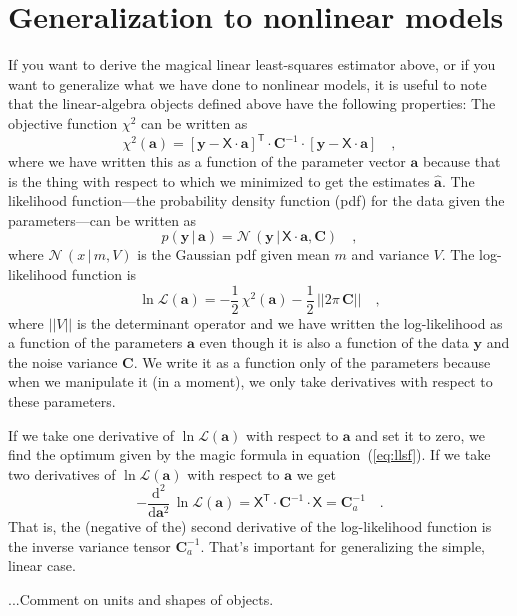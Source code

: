 \documentclass[10pt]{article}
\newcommand{\equationname}{equation}
\newcommand{\given}{\,|\,}
\newcommand{\dd}{\mathrm{d}}
\newcommand{\T}{^{\!\mathsf{T}\!}}
\newcommand{\inv}{^{-1}}
\renewcommand{\vector}[1]{\boldsymbol{#1}}
\newcommand{\tensor}[1]{\mathbf{#1}}
\renewcommand{\matrix}[1]{\mathsf{#1}}
\newcommand{\normal}{\mathcal{N}\!\,}
\newcommand{\like}{\mathscr{L}}
\newcommand{\va}{\vector{a}}
\newcommand{\vy}{\vector{y}}
\newcommand{\tC}{\tensor{C}}
\newcommand{\mX}{\matrix{X}}
\begin{document}
\section{Generalization to nonlinear models}

If you want to derive the magical linear least-squares estimator above,
or if you want to generalize what we have done to nonlinear models,
it is useful to note that the linear-algebra objects defined
above have the following properties:
The objective function $\chi^2$ can be written as
\begin{equation}
  \chi^2(\va) = [\vy - \mX\cdot\va]\T\cdot\tC\inv\cdot[\vy - \mX\cdot\va]
  \quad,
\end{equation}
where we have written this as a function of the parameter vector $\va$ because
that is the thing with respect to which we minimized to get the estimates
$\hat{\va}$.
The likelihood function---the probability density function (pdf) for
the data given the parameters---can be written as
\begin{equation}
  p(\vy\given\va) = \normal(\vy\given\mX\cdot\va,\tC)
  \quad,
\end{equation}
where $\normal(x\given m,V)$ is the Gaussian pdf given mean $m$ and variance $V$.
The log-likelihood function is
\begin{equation}
  \ln\like(\va) = -\frac{1}{2}\,\chi^2(\va) -\frac{1}{2}\,||2\pi\,\tC||
  \quad,
\end{equation}
where $||V||$ is the determinant operator and we have written the
log-likelihood as a function of the parameters $\va$ even though it is
also a function of the data $\vy$ and the noise variance $\tC$.
We write it as a function only of the parameters because when we manipulate it
(in a moment), we only take derivatives with respect to these parameters.

If we take one derivative of $\ln\like(\va)$ with respect to $\va$ and set it
to zero, we find the optimum given by the magic formula in
\equationname~(\ref{eq:llsf}).
If we take two derivatives of $\ln\like(\va)$ with respect to $\va$ we get
\begin{equation}
  -\frac{\dd^2}{\dd\va^2}\,\ln\like(\va) = \mX\T\cdot\tC\inv\cdot\mX = \tC_a\inv
  \quad.
\end{equation}
That is, the (negative of the) second derivative of the log-likelihood function is
the inverse variance tensor $\tC_a\inv$.
That's important for generalizing the simple, linear case.

...Comment on units and shapes of objects.
\end{document}

